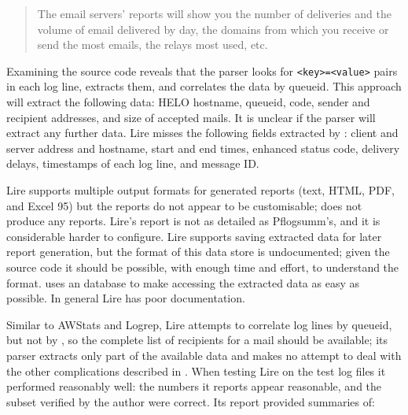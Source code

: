 \begin{quotation}

    \noindent{} The email servers' reports will show you the number of
    deliveries and the volume of email delivered by day, the domains from
    which you receive or send the most emails, the relays most used, etc.

\end{quotation}

\noindent{}Examining the source code reveals that the parser looks for
\texttt{<key>=<value>} pairs in each log line, extracts them, and
correlates the data by queueid.  This approach will extract the following
data: HELO hostname, queueid,  code, sender and recipient
addresses, and size of accepted mails.  It is unclear if the parser will
extract any further data.  Lire misses the following fields extracted by
\parsername{}: client and server  address and hostname, start
and end times, enhanced status code, delivery delays, timestamps of each
log line, and message ID\@.

Lire supports multiple output formats for generated reports (text, HTML,
PDF, and Excel 95) but the reports do not appear to be customisable;
\parsername{} does not produce any reports.  Lire's report is not as
detailed as Pflogsumm's, and it is considerable harder to configure.  Lire
supports saving extracted data for later report generation, but the format
of this data store is undocumented; given the source code it should be
possible, with enough time and effort, to understand the format.
\parsername{} uses an  database to make accessing the
extracted data as easy as possible.  In general Lire has poor
documentation.

Similar to AWStats and Logrep, Lire attempts to correlate log lines by
queueid, but not by , so the complete list of recipients for a
mail should be available; its parser extracts only part of the available
data and makes no attempt to deal with the other complications described in
.  When testing Lire on the \numberOFlogFILES{}
test log files it performed reasonably well: the numbers it reports appear
reasonable, and the subset verified by the author were correct.  Its report
provided summaries of:

